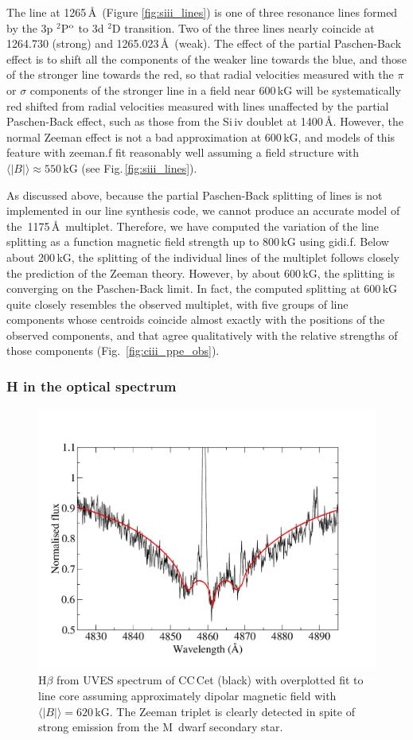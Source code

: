 \documentclass[fleqn,usenatbib]{mnras}
\newcommand{\bs}{\ensuremath{\langle \vert B \vert \rangle}}
\begin{document}
The   line at 1265\,\AA\ (Figure \ref{fig:siii_lines}) is one of three resonance lines formed by the 3p $^2$P$^{\rm o}$ to 3d $^2$D transition. Two of the three lines nearly coincide at 1264.730 (strong) and 1265.023\,\AA\ (weak). The effect of the partial Paschen-Back effect is to shift all the components of the weaker line towards the blue, and those of the stronger line towards the red, so that radial velocities measured with the $\pi$ or $\sigma$ components of the stronger line in a field near 600\,kG will be systematically red shifted from radial velocities measured with lines unaffected by the partial Paschen-Back effect, such as those from the Si\,{\sc iv} doublet at 1400\,\AA. However, the normal Zeeman effect is not a bad approximation at 600\,kG, and models of this feature with {\sc zeeman.f} fit reasonably well assuming a field structure with $\bs \approx 550$\,kG (see Fig.\,\ref{fig:siii_lines}).

As discussed above, because the partial Paschen-Back splitting of lines is not implemented in our line synthesis code, we cannot produce an accurate model of the  \,1175\,\AA\ multiplet. Therefore, we have computed the variation of the line splitting as a function magnetic field strength up to 800\,kG using {\sc gidi.f}. Below about 200\,kG, the splitting of the individual lines of the multiplet follows closely the prediction of the Zeeman theory. However, by about 600\,kG, the splitting is converging on the Paschen-Back limit. In fact, the computed splitting at 600\,kG quite closely resembles the observed multiplet, with five groups of line components whose centroids coincide almost exactly with the positions of the observed components, and that agree qualitatively with the relative strengths of those components (Fig.~\ref{fig:ciii_ppe_obs}).

\subsubsection{H in the optical spectrum}
\label{sec:hlines}
\begin{figure}
    \centering
    \includegraphics[width=9 cm]{hbeta_obs_fit.pdf}
    \caption{H$\beta$ from UVES spectrum of CC\,Cet (black) with overplotted fit to line core assuming approximately dipolar magnetic field with $\bs = 620$\,kG. The Zeeman triplet is clearly detected in spite of strong emission from the M~dwarf secondary star.}
    \label{fig:hbeta_obs_fit}
\end{figure}
\end{document}
